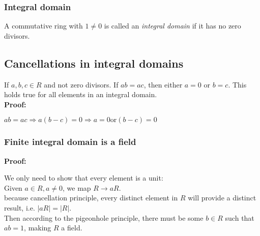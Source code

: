 \documentclass{article}
\begin{document}
\subsubsection{Integral domain}
A commutative ring with $1 \neq 0$ is called an \textit{integral domain} if it has no zero divisors.\\
\subsection{Cancellations in integral domains}
If $a,b,c \in R$ and not zero divisors. If $ab=ac$, then either $a=0$ or $b=c$. This holds true for all elements in an integral domain.\\
\textbf{Proof:}\\
\begin{addmargin}[1em]{0em}
    $ab=ac \Rightarrow a(b-c) = 0 \Rightarrow a=0 \textrm{or} (b-c) = 0$
\end{addmargin}
\subsubsection{Finite integral domain is a field}
\textbf{Proof:}\\
\begin{addmargin}[1em]{0em}
    We only need to show that every element is a unit:\\
    Given $a \in R, a\neq 0$, we map $R \rightarrow aR$.\\
    because cancellation principle, every distinct element in $R$ will provide a distinct result, i.e. $|aR| = |R|$.\\
    Then according to the pigeonhole principle, there must be some $b \in R$ such that $ab = 1$, making $R$ a field.
\end{addmargin}
\end{document}
